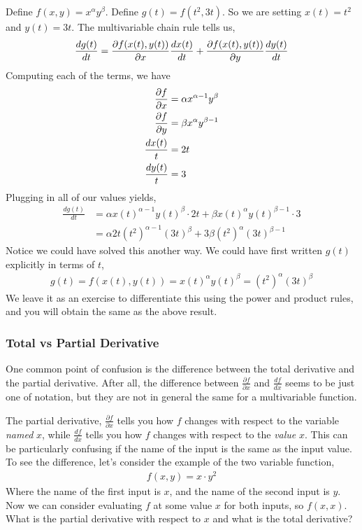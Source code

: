 \begin{example*}
    Define $f(x, y) = x^{\alpha}y^{\beta}$. Define $g(t) = f(t^2, 3t)$. So we are setting $x(t) = t^2$ and $y(t) = 3t$. The multivariable chain rule tells us,
    \begin{align*}
        \frac{dg(t)}{dt} = \frac{\partial f(x(t), y(t))}{\partial x} \frac{dx(t)}{dt} + \frac{\partial f(x(t), y(t))}{\partial y} \frac{dy(t)}{dt}
    \end{align*}
    Computing each of the terms, we have
    \begin{align*}
        \frac{\partial f}{\partial x} &= \alpha x^{\alpha - 1} y^{\beta} \\
        \frac{\partial f}{\partial y} &= \beta x^\alpha y^{\beta - 1} \\
        \frac{dx(t)}{t} &= 2t \\
        \frac{dy(t)}{t} &= 3
    \end{align*}
    Plugging in all of our values yields,
    \begin{align*}
        \frac{dg(t)}{dt} &= \alpha x(t)^{\alpha - 1} y(t)^{\beta} \cdot 2t + \beta x(t)^\alpha y(t)^{\beta - 1} \cdot 3 \\
        &= \alpha 2t (t^2)^{\alpha - 1} (3t)^{\beta} + 3 \beta (t^2)^\alpha (3t)^{\beta - 1}
    \end{align*}
    Notice we could have solved this another way. We could have first written $g(t)$ explicitly in terms of $t$,
    \begin{align*}
        g(t) = f(x(t), y(t)) = x(t)^\alpha y(t)^\beta = (t^2)^\alpha (3t)^\beta
    \end{align*}
    We leave it as an exercise to differentiate this using the power and product rules, and you will obtain the same as the above result.
\end{example*}

\subsubsection*{Total vs Partial Derivative}
One common point of confusion is the difference between the total derivative and the partial derivative. After all, the difference between $\frac{\partial f}{\partial x}$ and $\frac{d f}{d x}$ seems to be just one of notation, but they are not in general the same for a multivariable function. 

The partial derivative, $\frac{\partial f}{\partial x}$ tells you how $f$ changes with respect to the variable \emph{named} $x$, while $\frac{df}{dx}$ tells you how $f$ changes with respect to the \emph{value} $x$. This can be particularly confusing if the name of the input is the same as the input value. To see the difference, let's consider the example of the two variable function, 
\begin{align*}
    f(x, y) = x \cdot y^2
\end{align*}
Where the name of the first input is $x$, and the name of the second input is $y$. Now we can consider evaluating $f$ at some value $x$ for both inputs, so $f(x, x)$. What is the partial derivative with respect to $x$ and what is the total derivative?

